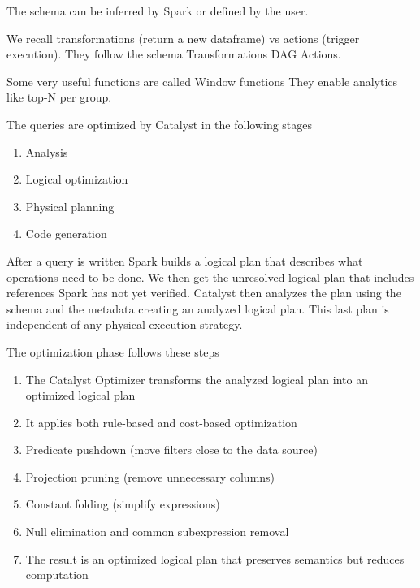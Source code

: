 The schema can be inferred by Spark or defined by the user.

\vspace{10pt}

We recall transformations (return a new dataframe) vs actions (trigger execution). They follow the schema Transformations \ra DAG \ra Actions.

\vspace{10pt}

Some very useful functions are called Window functions \ra They enable analytics like top-N per group.

\vspace{10pt}

The queries are optimized by Catalyst in the following stages

\begin{enumerate}
    \item Analysis
    \item Logical optimization
    \item Physical planning
    \item Code generation
\end{enumerate}

After a query is written Spark builds a logical plan that describes what operations need to be done. We then get the unresolved logical plan that includes references Spark has not yet verified. Catalyst then analyzes the plan using the schema and the metadata creating an analyzed logical plan. This last plan is independent of any physical execution strategy.

\vspace{10pt}

The optimization phase follows these steps

\begin{enumerate}
    \item The Catalyst Optimizer transforms the analyzed logical plan into an optimized logical plan
    \item It applies both rule-based and cost-based optimization
    \item Predicate pushdown (move filters close to the data source)
    \item Projection pruning (remove unnecessary columns)
    \item Constant folding (simplify expressions)
    \item Null elimination and common subexpression removal
    \item The result is an optimized logical plan that preserves semantics but reduces computation
\end{enumerate}

